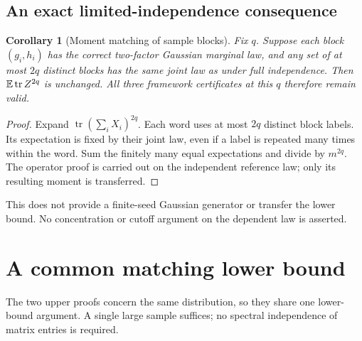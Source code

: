 \documentclass[11pt]{article}
\numberwithin{equation}{section}
\newtheorem{corollary}[theorem]{Corollary}
\theoremstyle{definition}\newtheorem{definition}[theorem]{Definition}
\theoremstyle{remark}\newtheorem{remark}[theorem]{Remark}
\newcommand{\tr}{\operatorname{tr}}\newcommand{\Ent}{\operatorname{Ent}}
\begin{document}
\subsection{An exact limited-independence consequence}
\begin{corollary}[Moment matching of sample blocks]\label{cor:limited}
Fix $q$. Suppose each block $(g_i,h_i)$ has the correct two-factor Gaussian
marginal law, and any set of at most $2q$ distinct blocks has the same joint law
as under full independence. Then $\E\tr Z^{2q}$ is unchanged. All three
framework certificates at this $q$ therefore remain valid.
\end{corollary}
\begin{proof}
Expand $\tr(\sum_iX_i)^{2q}$. Each word uses at most $2q$ distinct block labels.
Its expectation is fixed by their joint law, even if a label is repeated many
times within the word. Sum the finitely many equal expectations and divide by
$m^{2q}$. The operator proof is carried out on the independent reference law;
only its resulting moment is transferred.
\end{proof}
This does not provide a finite-seed Gaussian generator or transfer the lower
bound. No concentration or cutoff argument on the dependent law is asserted.

\section{A common matching lower bound}\label{sec:lower}
The two upper proofs concern the same distribution, so they share one lower-bound
argument. A single large sample suffices; no spectral independence of matrix
entries is required.
\end{document}
